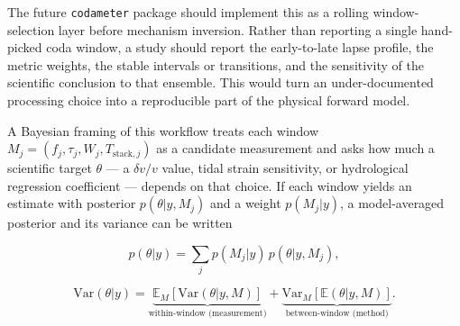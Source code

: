 \documentclass[draft]{agujournal2019}
\begin{document}
The future \texttt{codameter} package should implement this as a rolling
window-selection layer before mechanism inversion. Rather than reporting
a single hand-picked coda window, a study should report the
early-to-late lapse profile, the metric weights, the stable intervals or
transitions, and the sensitivity of the scientific conclusion to that
ensemble. This would turn an under-documented processing choice into a
reproducible part of the physical forward model.

A Bayesian framing of this workflow treats each window
\(M_j=(f_j,\tau_j,W_j,T_{\mathrm{stack},j})\) as a candidate measurement
and asks how much a scientific target \(\theta\) --- a \(\delta v/v\)
value, tidal strain sensitivity, or hydrological regression coefficient
--- depends on that choice. If each window yields an estimate with
posterior \(p(\theta|y,M_j)\) and a weight \(p(M_j|y)\), a
model-averaged posterior and its variance can be written

\[p(\theta|y)=\sum_j p(M_j|y)\,p(\theta|y,M_j), \tag{17}\]

\[\mathrm{Var}(\theta|y)=\underbrace{\mathbb{E}_{M}[\mathrm{Var}(\theta|y,M)]}_{\text{within-window (measurement)}}+\underbrace{\mathrm{Var}_{M}[\mathbb{E}(\theta|y,M)]}_{\text{between-window (method)}}. \tag{18}\]
\end{document}
